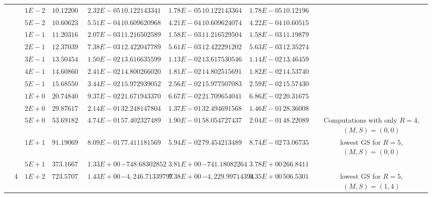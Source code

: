 \begin{landscape}
\begin{table}[ht]
{\begin{tabular}[c]{c|c|c|c|c|c|c|c|c|c|c}
& &$1E-2$ & $10.122006554490$ & $2.32E-05$ & $10.122143341441$ & $1.78E-05$ & $10.122143364498$ & $1.78E-05$ & $10.121963352201$ & \\
& &$5E-2$ & $10.606237585801$ & $5.51E-04$ & $10.609620968271$ & $4.21E-04$ & $10.609624074760$ & $4.22E-04$ & $10.605151307825$ & \\
& &$1E-1$ & $11.203164005504$ & $2.07E-03$ & $11.216502589201$ & $1.58E-03$ & $11.216529504155$ & $1.58E-03$ & $11.198791644206$ & \\
& &$2E-1$ & $12.370396017420$ & $7.38E-03$ & $12.422047789038$ & $5.61E-03$ & $12.422291202576$ & $5.63E-03$ & $12.352740173584$ & \\
& &$3E-1$ & $13.504544464008$ & $1.50E-02$ & $13.616635599511$ & $1.13E-02$ & $13.617530546057$ & $1.14E-02$ & $13.464591945533$ & \\
& &$4E-1$ & $14.608605661990$ & $2.41E-02$ & $14.800266020621$ & $1.81E-02$ & $14.802515691607$ & $1.82E-02$ & $14.537409076271$ & \\
& &$5E-1$ & $15.685501416282$ & $3.44E-02$ & $15.972939052367$ & $2.56E-02$ & $15.977507083641$ & $2.59E-02$ & $15.574301411949$ & \\
& &$1E+0$ & $20.748402254288$ & $9.37E-02$ & $21.671943370641$ & $6.67E-02$ & $21.709654041743$ & $6.86E-02$ & $20.316754002510$ & \\
& &$2E+0$ & $29.876173541426$ & $2.14E-01$ & $32.248147804911$ & $1.37E-01$ & $32.494691568810$ & $1.46E-01$ & $28.360088424685$ & \\
& &$5E+0$ & $53.691824552566$ & $4.74E-01$ & $57.402327489498$ & $1.90E-01$ & $58.054727437434$ & $2.04E-01$ & $48.220896992378$ & \multirow{-20}{3cm}{Computations with only $R=4$, $(M,S)=(0,0)$}  \\ \cline{10-11}
& &$1E+1$ & $91.190697218117$ & $8.09E-01$ & $77.411181569731$ & $5.94E-02$ & $79.454213489636$ & $8.74E-02$ & $73.067354457427$ & lowest GS for $R=5$, $(M,S)=(0,0)$\\ \cline{10-11}
& &$5E+1$ & $373.166706573103$ & $1.33E+00$ & $-748.683028521954$ & $3.81E+00$ & $-741.180822646665$ & $3.78E+00$ & $266.841126091951$ &  \\
& \multirow{-23}{*}{4}  &$1E+2$ & $723.570709199507$ & $1.43E+00$ & $-4,246.713397970430$ & $9.38E+00$ & $-4,229.997143945580$ & $9.35E+00$ & $506.530170970484$ & \multirow{-2}{3cm}{lowest GS for $R=5$, $(M,S)=(1,4)$}\\ \cline{2-11}



\end{tabular}}
\end{table}
\end{landscape}

